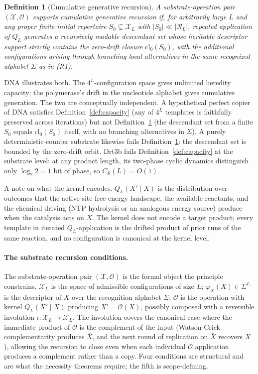 \documentclass[aps,prx,reprint,amsmath,amssymb,floatfix,superscriptaddress,nofootinbib]{revtex4-2}
\theoremstyle{plain-thm}
\theoremstyle{definition-thm}
\newtheorem{definition}{Definition}
\newcommand{\Csub}{C_{\mathcal{S}}}
\newcommand{\descX}{\varphi_X}
\newcommand{\Xset}{\mathcal{X}}
\newcommand{\Op}{\mathcal{O}}
\newcommand{\Reach}{\mathcal{R}}
\begin{document}
\begin{definition}[Cumulative generative recursion]
\label{def:generation}
A substrate-operation pair $(\Xset, \Op)$ supports \textnormal{cumulative generative recursion} if, for arbitrarily large $L$ and any proper finite initial repertoire $S_0 \subsetneq \Xset_L$ with $|S_0| \ll |\Reach_L|$, repeated application of $Q_L$ generates a recursively readable descendant set whose heritable descriptor support strictly contains the zero-drift closure $\mathrm{cl}_0(S_0)$, with the additional configurations arising through branching local alternatives in the same recognized alphabet $\Sigma$ as in (R1).
\end{definition}

DNA illustrates both. The $4^L$-configuration space gives unlimited heredity capacity; the polymerase's drift in the nucleotide alphabet gives cumulative generation. The two are conceptually independent. A hypothetical perfect copier of DNA satisfies Definition~\ref{def:capacity} (any of $4^L$ templates is faithfully preserved across iterations) but not Definition~\ref{def:generation} (the descendant set from a finite $S_0$ equals $\mathrm{cl}_0(S_0)$ itself, with no branching alternatives in $\Sigma$). A purely deterministic-counter substrate likewise fails Definition~\ref{def:generation}: the descendant set is bounded by the zero-drift orbit. Drt3b fails Definition~\ref{def:capacity} at the substrate level: at any product length, its two-phase cyclic dynamics distinguish only $\log_2 2 = 1$ bit of phase, so $\Csub(L) = O(1)$.

A note on what the kernel encodes. $Q_L(X' \mid X)$ is the distribution over outcomes that the active-site free-energy landscape, the available reactants, and the chemical driving (NTP hydrolysis or an analogous energy source) produce when the catalysis acts on $X$. The kernel does not encode a target product; every template in iterated $Q_L$-application is the drifted product of prior runs of the same reaction, and no configuration is canonical at the kernel level.

\paragraph{The substrate recursion conditions.}

The substrate-operation pair $(\Xset, \Op)$ is the formal object the principle constrains. $\Xset_L$ is the space of admissible configurations of size $L$; $\descX(X) \in \Sigma^L$ is the descriptor of $X$ over the recognition alphabet $\Sigma$; $\Op$ is the operation with kernel $Q_L(X' \mid X)$ producing $X' = \Op(X)$, possibly composed with a reversible involution $\iota: \Xset_L \to \Xset_L$. The involution covers the canonical case where the immediate product of $\Op$ is the complement of the input (Watson-Crick complementarity produces $\bar{X}$, and the next round of replication on $\bar{X}$ recovers $X$), allowing the recursion to close even when each individual $\Op$ application produces a complement rather than a copy. Four conditions are structural and are what the necessity theorems require; the fifth is scope-defining.
\end{document}
